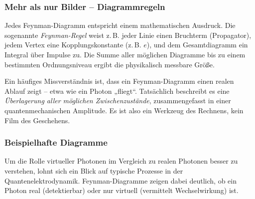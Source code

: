 \subsubsection*{Mehr als nur Bilder – Diagrammregeln}
{}
Jedes Feynman-Diagramm entspricht einem mathematischen Ausdruck. Die sogenannte \emph{Feynman-Regel} weist z.\,B. jeder Linie einen Bruchterm (Propagator), jedem Vertex eine Kopplungskonstante (z.\,B. $e$), und dem Gesamtdiagramm ein Integral über Impulse zu. Die Summe aller möglichen Diagramme bis zu einem bestimmten Ordnungsniveau ergibt die physikalisch messbare Größe.

\medskip
\begin{tcolorbox}[didaktikbox, title=Diagramm ist nicht gleich Realität]
	\label{boxx:Diagramm ist nicht gleich realität}
	Ein häufiges Missverständnis ist, dass ein Feynman-Diagramm einen realen Ablauf zeigt – etwa wie ein Photon „fliegt“. Tatsächlich beschreibt es eine \emph{Überlagerung aller möglichen Zwischenzustände}, zusammengefasst in einer quantenmechanischen Amplitude. Es ist also ein Werkzeug des Rechnens, kein Film des Geschehens.
\end{tcolorbox}

\subsubsection{Beispielhafte Diagramme}

Um die Rolle virtueller Photonen im Vergleich zu realen Photonen besser zu verstehen, lohnt sich ein Blick auf typische Prozesse in der Quantenelektrodynamik. Feynman-Diagramme zeigen dabei deutlich, ob ein Photon real (detektierbar) oder nur virtuell (vermittelt Wechselwirkung) ist.

